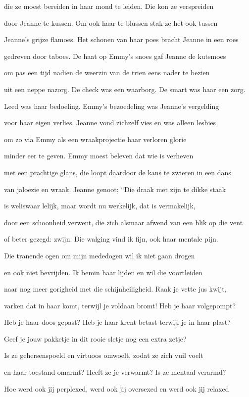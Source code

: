 die ze moest bereiden
in haar mond te leiden.
Die kon ze verspreiden

door Jeanne te kussen.
Om ook haar te blussen
stak ze het ook tussen

Jeanne’s grijze flamoes.
Het schonen van haar poes
bracht Jeanne in een roes

gedreven door taboes.
De haat op Emmy’s snoes
gaf Jeanne de kutsmoes

om pas een tijd nadien
de weerzin van de trien
eens nader te bezien

uit een neppe nazorg.
De check was een waarborg.
De smart was haar een zorg.

Leed was haar bedoeling.
Emmy’s bezoedeling
was Jeanne’s vergelding

voor haar eigen verlies.
Jeanne vond zichzelf vies
en was alleen lesbies

om zo via Emmy
als een wraakprojectie
haar verloren glorie

minder eer te geven.
Emmy moest beleven
dat wie is verheven

met een prachtige glans,
die loopt daardoor de kans
te zwieren in een dans

van jaloezie en wraak.
Jeanne genoot; “Die draak
met zijn te dikke staak

is weliswaar lelijk,
maar wordt nu werkelijk,
dat is vermakelijk,

door een schoonheid verwent,
die zich alsmaar afwend
van een blik op die vent

of beter gezegd: zwijn.
Die walging vind ik fijn,
ook haar mentale pijn.

Die tranende ogen
om mijn mededogen
wil ik niet gaan drogen

en ook niet bevrijden.
Ik bemin haar lijden
en wil die voortleiden

naar nog meer gorigheid
met die schijnheiligheid.
Raak je vette jus kwijt,

varken dat in haar komt,
terwijl je voldaan bromt!
Heb je haar volgepompt?

Heb je haar doos gepast?
Heb je haar krent betast
terwijl je in haar plast?

Geef je jouw pakketje
in dit rooie sletje
nog een extra zetje?

Is ze gehersenspoeld
en virtuoos omwoelt,
zodat ze zich vuil voelt

en haar toestand omarmt?
Heeft ze je verwarmt?
Is ze mentaal verarmd?

Hoe werd ook jij perplexed,
werd ook jij oversexed
en werd ook jij relaxed


